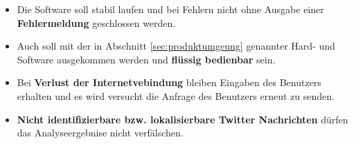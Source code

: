 \begin{itemize}[noitemsep,topsep=0.5em]
	\item Die Software soll stabil laufen und bei Fehlern nicht ohne Ausgabe einer \textbf{Fehlermeldung} geschlossen werden.
	\item Auch soll mit der in Abschnitt \ref{sec:produktumgeung} genannter Hard- und Software ausgekommen werden und \textbf{flüssig bedienbar} sein.
	\item Bei \textbf{Verlust der Internetvebindung} bleiben Eingaben des Benutzers erhalten und es wird versucht die Anfrage des Benutzers erneut zu senden.
	\item \textbf{Nicht identifizierbare bzw. lokalisierbare Twitter Nachrichten} dürfen das Analyseergebnise nicht verfälschen.
\end{itemize}
